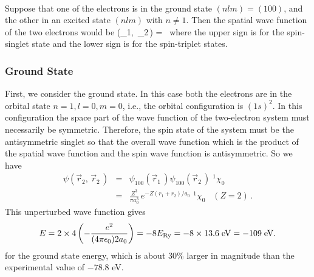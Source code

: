 \paragraph{}
Suppose that one of the electrons is in the ground state $(nlm)=(100)$, and the other in an excited state $(nlm)$ with $n\neq 1$.
Then the spatial wave function of the two electrons would be
\be
\phi(_1,\, _2\,) = \, 
\ee
where the upper sign is for the spin-singlet state  and the lower sign is for the spin-triplet states. 


\subsubsection{Ground State}
First, we consider the ground state. In this case both the electrons are in the orbital state $n=1,l=0,m=0$, i.e., the orbital configuration is $(1s)^2$. In this configuration the space part of the wave function of the two-electron system must necessarily
be symmetric. Therefore, the spin state of the system must be the antisymmetric singlet so that the overall wave function which is the product of the spatial wave function and the spin wave function is antisymmetric. So we have
\begin{eqnarray}
\psi(\vec{r}_2,\, \vec{r}_2\,) & = & \psi_{100}(\vec{r}_1\,)\psi_{100}(\vec{r}_2\,)\; ^1\chi_0 \nonumber \\
& = & \frac{Z^3}{\pi a_0^3}\, e^{-Z(r_1+r_2)/a_0}\,\, ^1\chi_0 \;\;\; (Z=2)\, .
\end{eqnarray}
This unperturbed wave function gives
\[ E= 2 \times 4\left(- \frac{e^2}{(4\pi\epsilon_0)2a_0}\right) = -8E_{\rm{Ry}} = -8 \times 13.6\; {\rm eV} = -109\; {\rm eV}.\]
for the ground state energy, which is about 30\% larger in magnitude than the experimental value of $-78.8$ eV.

